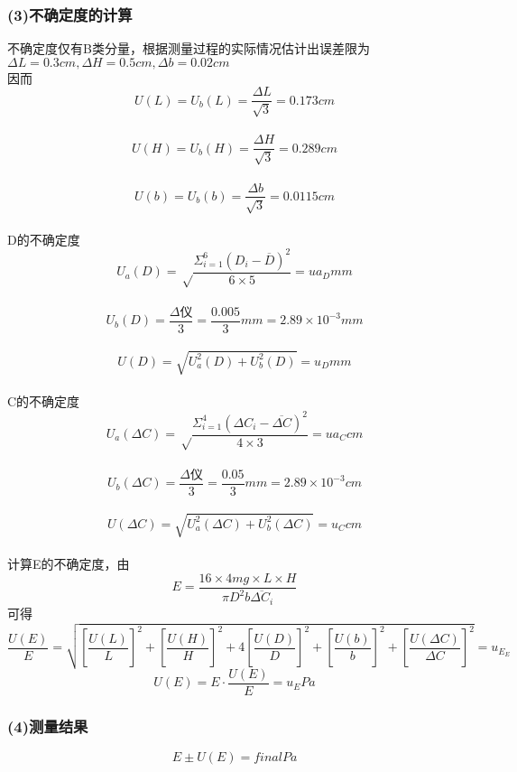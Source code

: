 \subsubsection*{(3)不确定度的计算}
\noindent
不确定度仅有B类分量，根据测量过程的实际情况估计出误差限为$\Delta L = 0.3cm, \Delta H = 0.5cm, \Delta b = 0.02cm$ \\
因而 $$U(L) = U_b(L) = \frac{\Delta L}{\sqrt{3} } = 0.173cm$$ \\
$$U(H) = U_b(H) = \frac{\Delta H}{\sqrt{3} } = 0.289cm$$ \\
$$U(b) = U_b(b) = \frac{\Delta b}{\sqrt{3} } = 0.0115cm$$ \\
D的不确定度 \\
$$U_a(D) = \sqrt\frac{\Sigma_{i=1}^6{(D_i-\overline{D})^2} }{6\times5} = {{ua_D}}mm$$ \\
$$U_b(D) = \frac{\Delta \text{仪} }{3}=\frac{0.005}{3}mm = 2.89 \times 10^{-3}mm$$ \\
$$U(D) = \sqrt{U_a^2(D) + U_b^2(D)}={{u_D}}mm$$ \\
C的不确定度 \\
$$U_a(\Delta C) = \sqrt\frac{\Sigma_{i=1}^4{(\Delta C_i-\overline{\Delta C})^2} }{4\times3} = {{ua_C}}cm$$ \\
$$U_b(\Delta C) = \frac{\Delta \text{仪} }{3}=\frac{0.05}{3}mm = 2.89 \times 10^{-3}cm$$ \\
$$U(\Delta C) = \sqrt{U_a^2(\Delta C) + U_b^2(\Delta C)}={{u_C}}cm$$ \\
计算E的不确定度，由$$E = \frac{16 \times 4mg \times L \times H}{\pi D^2b\overline{\Delta C_i} }$$可得
$$\frac{U(E)}{E}=\sqrt{ [\frac{U(L)}{L}]^2 + [\frac{U(H)}{H}]^2 + 4[\frac{U(D)}{D}]^2 + [\frac{U(b)}{b}]^2 + [\frac{U(\Delta C)}{\Delta C}]^2 } = {{u_E_E}}$$
$$U(E) = E\cdot \frac{U(E)}{E} = {{u_E}}Pa$$
\subsubsection*{(4)测量结果}
\noindent
$$E \pm U(E) = {{final}} Pa$$
